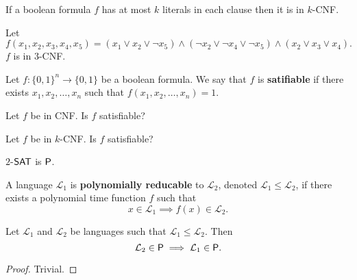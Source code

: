 \begin{definition}[$k$-CNF]
    If a boolean formula $f$
    has at most $k$ literals in each clause
    then it is in $k$-CNF.
\end{definition}

\begin{example}
    Let
    \[
        f(x_1,x_2,x_3,x_4,x_5) =
        (x_1 \lor x_2 \lor \neg x_5)
        \land
        (\neg x_2 \lor \neg x_4 \lor \neg x_5)
        \land
        (x_2 \lor x_3 \lor x_4).
    \]
    $f$ is in $3$-CNF.
\end{example}

\begin{definition}[Satifiable]
    Let $f: \{0,1\}^n \to \{0,1\}$ be a boolean formula.
    We say that $f$ is \textbf{satifiable} if there exists
    $x_1,x_2,\ldots,x_n$
    such that
    $f(x_1,x_2,\ldots,x_n) = 1$.
\end{definition}

\begin{problem}[$\sat$]
    Let $f$ be in CNF.
    Is $f$ satisfiable?
\end{problem}

\begin{problem}[$k$-$\sat$]
    Let $f$ be in $k$-CNF.
    Is $f$ satisfiable?
\end{problem}

\begin{proposition}[]
    $2$-$\sat$ is $\mathsf P$.
\end{proposition}

\begin{definition}[]
    A language $\mathcal L_1$ is \textbf{polynomially reducable} to 
    $\mathcal L_2$, denoted $\mathcal L_1 \leq \mathcal L_2$,
    if there exists a polynomial time function $f$ such that
    \[
        x \in \mathcal L_1 \implies f(x) \in \mathcal L_2.
    \]
\end{definition}

\begin{lemma}[]
    Let $\mathcal L_1$ and $\mathcal L_2$ be languages
    such that $\mathcal L_1 \leq \mathcal L_2$.
    Then
    \[
        \mathcal L_2 \in \mathsf P \implies \mathcal L_1 \in \mathsf P.
    \]
\end{lemma}

\begin{proof}
    Trivial.
\end{proof}
